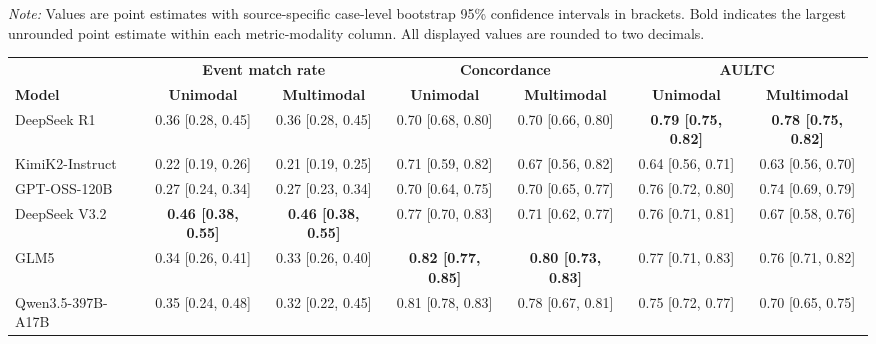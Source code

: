 \begin{minipage}{\textwidth}
\begin{adjustbox}{max width=\textwidth}
\begin{tabular}{@{}lcccccc@{}}
\bottomrule
\end{tabular}
\end{adjustbox}
\par\vspace{0.3em}
\begin{minipage}{\textwidth}
\footnotesize\textit{Note:} Values are point estimates with source-specific case-level bootstrap 95\% confidence intervals in brackets. Bold indicates the largest unrounded point estimate within each metric-modality column. All displayed values are rounded to two decimals.
\end{minipage}
\end{minipage}\par\medskip

\par\medskip
\noindent\begin{minipage}{\textwidth}
\centering
\scriptsize
\begin{adjustbox}{max width=\textwidth}
\begin{tabular}{@{}lcccccc@{}}
\toprule
& \multicolumn{2}{c}{\textbf{Event match rate}} & \multicolumn{2}{c}{\textbf{Concordance}} & \multicolumn{2}{c}{\textbf{AULTC}} \\
\cmidrule(lr){2-3}\cmidrule(lr){4-5}\cmidrule(l){6-7}
\textbf{Model} & \textbf{Unimodal} & \textbf{Multimodal} & \textbf{Unimodal} & \textbf{Multimodal} & \textbf{Unimodal} & \textbf{Multimodal} \\
\midrule
DeepSeek R1 & 0.36 [0.28, 0.45] & 0.36 [0.28, 0.45] & 0.70 [0.68, 0.80] & 0.70 [0.66, 0.80] & \textbf{0.79 [0.75, 0.82]} & \textbf{0.78 [0.75, 0.82]} \\
KimiK2-Instruct & 0.22 [0.19, 0.26] & 0.21 [0.19, 0.25] & 0.71 [0.59, 0.82] & 0.67 [0.56, 0.82] & 0.64 [0.56, 0.71] & 0.63 [0.56, 0.70] \\
GPT-OSS-120B & 0.27 [0.24, 0.34] & 0.27 [0.23, 0.34] & 0.70 [0.64, 0.75] & 0.70 [0.65, 0.77] & 0.76 [0.72, 0.80] & 0.74 [0.69, 0.79] \\
DeepSeek V3.2 & \textbf{0.46 [0.38, 0.55]} & \textbf{0.46 [0.38, 0.55]} & 0.77 [0.70, 0.83] & 0.71 [0.62, 0.77] & 0.76 [0.71, 0.81] & 0.67 [0.58, 0.76] \\
GLM5 & 0.34 [0.26, 0.41] & 0.33 [0.26, 0.40] & \textbf{0.82 [0.77, 0.85]} & \textbf{0.80 [0.73, 0.83]} & 0.77 [0.71, 0.83] & 0.76 [0.71, 0.82] \\
Qwen3.5-397B-A17B & 0.35 [0.24, 0.48] & 0.32 [0.22, 0.45] & 0.81 [0.78, 0.83] & 0.78 [0.67, 0.81] & 0.75 [0.72, 0.77] & 0.70 [0.65, 0.75] \\

\end{tabular}
\end{adjustbox}
\end{minipage}
